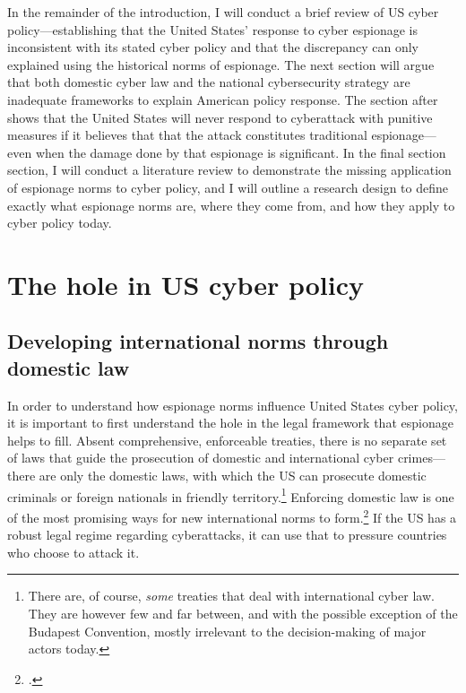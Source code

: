 \documentclass[11pt]{memoir}
\begin{document}
\begin{refsegment}
In the remainder of the introduction, I will conduct a brief review of US cyber policy---establishing that the United States' response to cyber espionage is inconsistent with its stated cyber policy and that the discrepancy can only explained using the historical norms of espionage. The next section will argue that both domestic cyber law and the national cybersecurity strategy are inadequate frameworks to explain American policy response. The section after shows that the United States will never respond to cyberattack with punitive measures if it believes that that the attack constitutes traditional espionage---even when the damage done by that espionage is significant. In the final section section, I will conduct a literature review to demonstrate the missing application of espionage norms to cyber policy, and I will outline a research design to define exactly what espionage norms are, where they come from, and how they apply to cyber policy today.

\section{The hole in US cyber policy}
\subsection{Developing international norms through domestic law}
In order to understand how espionage norms influence United States cyber policy, it is important to first understand the hole in the legal framework that espionage helps to fill. Absent comprehensive, enforceable treaties, there is no separate set of laws that guide the prosecution of domestic and international cyber crimes---there are only the domestic laws, with which the US can prosecute domestic criminals or foreign nationals in friendly territory.\footnote{There are, of course, \emph{some} treaties that deal with international cyber law. They are however few and far between, and with the possible exception of the Budapest Convention, mostly irrelevant to the decision-making of major actors today.} Enforcing domestic law is one of the most promising ways for new international norms to form.\footcite[p.~295]{deeks_international_2015} If the US has a robust legal regime regarding cyberattacks, it can use that to pressure countries who choose to attack it.


\end{refsegment}
\end{document}
